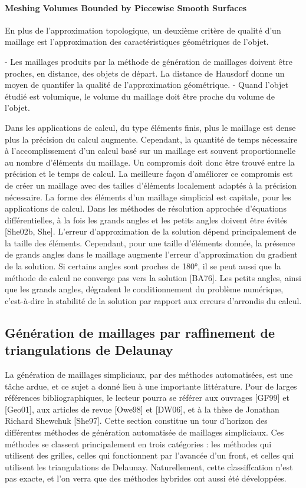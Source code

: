 \paragraph{Meshing Volumes Bounded by Piecewise Smooth Surfaces~\cite{LRineau2007}}{

En plus de l'approximation topologique, un deuxième critère de qualité d'un maillage est l'approximation des caractéristiques géométriques de l'objet.

 - Les maillages produits par la méthode de génération de maillages doivent être proches, en distance, des objets de départ. La distance de Hausdorf donne un moyen de quantifer la qualité de l'approximation géométrique.
 - Quand l'objet étudié est volumique, le volume du maillage doit être proche du volume de l'objet.



Dans les applications de calcul, du type éléments finis, plus le maillage est dense plus la précision du calcul augmente. Cependant, la quantité de temps nécessaire à l'accomplissement d'un calcul basé sur un maillage est souvent proportionnelle au nombre d'éléments du maillage. Un compromis doit donc être trouvé entre la précision et le temps de calcul. La meilleure façon d'améliorer ce compromis est de créer un maillage avec des tailles d'éléments localement adaptés à la précision nécessaire. La forme des éléments d'un maillage simplicial est capitale, pour les applications de calcul. Dans les méthodes de résolution approchée d'équations différentielles, à la fois les grands angles et les petits angles doivent être évités [She02b, She]. L'erreur d'approximation de la solution dépend principalement de la taille des éléments. Cependant, pour une taille d'éléments donnée, la présence de grands angles dans le maillage augmente l'erreur d'approximation du gradient de la solution. Si certains angles sont proches de 180°, il se peut aussi que la méthode de calcul ne converge pas vers la solution [BA76]. Les petits angles, ainsi que les grands angles, dégradent le conditionnement du problème numérique, c'est-à-dire la stabilité de la solution par rapport aux erreurs d'arrondis du calcul. 

\subsection{G\'en\'eration de maillages par raffinement de triangulations de Delaunay}

La génération de maillages simpliciaux, par des méthodes automatisées, est une t\^ache ardue, et ce sujet a donné lieu à une importante littérature. Pour de larges références bibliographiques, le lecteur pourra se référer aux ouvrages [GF99] et [Geo01], aux articles de revue [Owe98] et [DW06], et à la thèse de Jonathan Richard Shewchuk [She97]. Cette section constitue un tour d'horizon des différentes méthodes de génération automatisée de maillages simpliciaux. Ces méthodes se classent principalement en trois catégories : les méthodes qui utilisent des grilles, celles qui fonctionnent par l'avancée d'un front, et celles qui utilisent les triangulations de Delaunay. Naturellement, cette classiffcation n'est pas exacte, et l'on verra que des méthodes hybrides ont aussi été développées.

}
